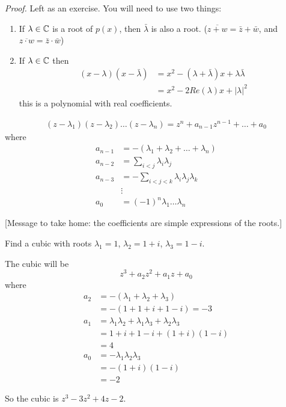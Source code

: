 \documentclass[twoside]{scrartcl}
\begin{document}
\emph{Proof.} Left as an exercise. You will need to use two things: 
\begin{enumerate}
\item If $\lambda \in\mathbb{C}$ is a root of $p(x)$, then $\bar{\lambda}$ is also a root. ($\overline{z+ w} = \bar{z} + \bar{w}$, and $\overline{z \cdot w} = \bar{z} \cdot \bar{w}$)

\item If $\lambda \in\mathbb{C}$ then 
\[
\begin{aligned}
  (x-\lambda)(x-\bar{\lambda}) &= x^2 - (\lambda + \bar{\lambda})x + \lambda\bar{\lambda}\\
  &= x^2 - 2Re(\lambda)x + |\lambda|^2
\end{aligned}
\]
this is a polynomial with real coefficients. \\
\end{enumerate}





\[
\begin{aligned}
  (z-\lambda_1)(z-\lambda_2)\dots(z-\lambda_n) = z^n + a_{n-1}z^{n-1} + \dots + a_0
\end{aligned}
\]
where 
\[
\begin{aligned}
  a_{n-1} &= -(\lambda_1 + \lambda_2 + \dots + \lambda_n)\\
  a_{n-2} &= \sum_{i < j} \lambda_i\lambda_j\\
  a_{n-3} &= -\sum_{i < j< k} \lambda_i \lambda_j \lambda_k\\
  &\vdots \\
  a_0 &= (-1)^n \lambda_1\dots \lambda_n
\end{aligned}
\]\vspace*{5pt}

[Message to take home: the coefficients are simple expressions of the roots.]\\

\begin{example}
Find a cubic with roots $\lambda_1 = 1$, $\lambda_2 = 1 + i$, $\lambda_3 = 1-i$.

The cubic will be 
\[z^3 + a_2 z^2 + a_1z + a_0\]
where 
\[
\begin{aligned}
    a_2 &= -(\lambda_1 + \lambda_2 + \lambda_3)\\
  &= -(1+ 1 + i + 1 -i) = -3\\[0.3cm]
    a_1 &= \lambda_1\lambda_2 + \lambda_1\lambda_3 + \lambda_2\lambda_3\\
  &= 1 + i + 1 - i + (1+i)(1-i)\\
  &= 4\\[0.3cm]
  a_0 &= -\lambda_1\lambda_2\lambda_3 \\
  &= -(1 + i)(1-i)\\
  &= -2
\end{aligned}
\]

So the cubic is $z^3 -3z^2 + 4z - 2$. 
\end{example}\vspace*{10pt}
\end{document}
